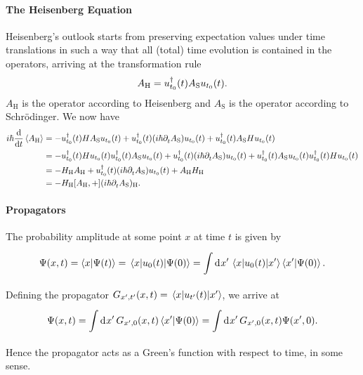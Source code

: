 \paragraph{The Heisenberg Equation}
Heisenberg's outlook starts from preserving expectation values under time translations in such a way that all (total) time evolution is contained in the operators, arriving at the transformation rule
\begin{align*}
	A_{\text{H}} = u_{t_{0}}^{\dagger}(t)A_{\text{S}}u_{t_{0}}(t).
\end{align*}
$A_{\text{H}}$ is the operator according to Heisenberg and $A_{\text{S}}$ is the operator according to Schrödinger. We now have
\begin{align*}
	i\hbar\dv{t}\expval{A_{\text{H}}} &= -\adj{u_{t_{0}}}(t)HA_{\text{S}}u_{t_{0}}(t) + \adj{u_{t_{0}}}(t)(i\hbar\del{t}{A_{\text{S}}})u_{t_{0}}(t) + \adj{u_{t_{0}}}(t)A_{\text{S}}Hu_{t_{0}}(t) \\
	                                  &= -\adj{u_{t_{0}}}(t)Hu_{t_{0}}(t)\adj{u_{t_{0}}}(t)A_{\text{S}}u_{t_{0}}(t) + \adj{u_{t_{0}}}(t)(i\hbar\del{t}{A_{\text{S}}})u_{t_{0}}(t) + \adj{u_{t_{0}}}(t)A_{\text{S}}u_{t_{0}}(t)\adj{u_{t_{0}}}(t)Hu_{t_{0}}(t) \\
	                                  &= -H_{\text{H}}A_{\text{H}} + \adj{u_{t_{0}}}(t)(i\hbar\del{t}{A_{\text{S}}})u_{t_{0}}(t) + A_{\text{H}}H_{\text{H}} \\
	                                  &= -{H_{\text{H}}}\comm{A_{\text{H}}} + (i\hbar\del{t}{A_{\text{S}}})_{\text{H}}.
\end{align*}

\paragraph{Propagators}
The probability amplitude at some point $x$ at time $t$ is given by
\begin{align*}
	\Psi(x, t) = \braket{x}{\Psi(t)} = \mel{x}{u_{0}(t)}{\Psi(0)} = \int\limits_{}^{}\dd[]{x^{\prime}}\mel{x}{u_{0}(t)}{x^{\prime}}\braket{x^{\prime}}{\Psi(0)}.
\end{align*}
Defining the propagator $G_{x^{\prime}, t^{\prime}}(x, t) = \mel{x}{u_{t^{\prime}}(t)}{x^{\prime}}$, we arrive at
\begin{align*}
	\Psi(x, t) = \int\limits_{}^{}\dd[]{x^{\prime}}G_{x^{\prime}, 0}(x, t)\braket{x^{\prime}}{\Psi(0)} = \int\limits_{}^{}\dd[]{x^{\prime}}G_{x^{\prime}, 0}(x, t)\Psi(x^{\prime}, 0).
\end{align*}
Hence the propagator acts as a Green's function with respect to time, in some sense.

